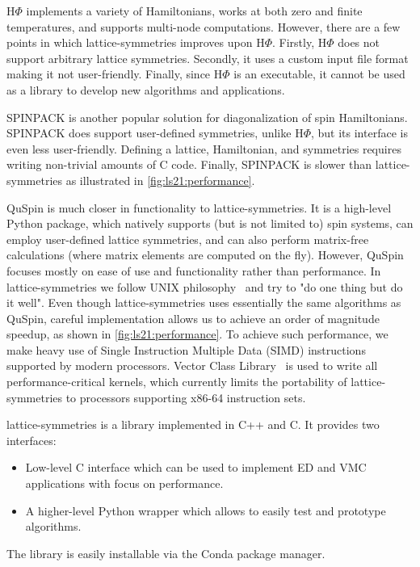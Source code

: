 $\text{H}\Phi$ implements a variety of Hamiltonians, works at both zero and finite temperatures, and supports multi-node computations. However, there are a few points in which lattice-symmetries improves upon $\text{H}\Phi$. Firstly, $\text{H}\Phi$ does not support arbitrary lattice symmetries. Secondly, it uses a custom input file format making it not user-friendly. Finally, since $\text{H}\Phi$ is an executable, it cannot be used as a library to develop new algorithms and applications.

SPINPACK is another popular solution for diagonalization of spin Hamiltonians. SPINPACK does support user-defined symmetries, unlike $\text{H}\Phi$, but its interface is even less user-friendly. Defining a lattice, Hamiltonian, and symmetries requires writing non-trivial amounts of C code. Finally, SPINPACK is slower than lattice-symmetries as illustrated in \autoref{fig:ls21:performance}.

QuSpin is much closer in functionality to lattice-symmetries. It is a high-level Python package, which natively supports (but is not limited to) spin systems, can employ user-defined lattice symmetries, and can also perform matrix-free calculations (where matrix elements are computed on the fly). However, QuSpin focuses mostly on ease of use and functionality rather than performance. In lattice-symmetries we follow UNIX philosophy~\cite{salus1994} and try to "do one thing but do it well". Even though lattice-symmetries uses essentially the same algorithms as QuSpin, careful implementation allows us to achieve an order of magnitude speedup, as shown in \autoref{fig:ls21:performance}. To achieve such performance, we make heavy use of Single Instruction Multiple Data (SIMD) instructions supported by modern processors. Vector Class Library~\cite{vectorclass} is used to write all performance-critical kernels, which currently limits the portability of lattice-symmetries to processors supporting x86-64 instruction sets.

lattice-symmetries is a library implemented in C++ and C. It provides two interfaces:
\begin{itemize}[topsep=0pt,noitemsep]
  \item Low-level C interface which can be used to implement ED and VMC applications with focus on performance.
  \item A higher-level Python wrapper which allows to easily test and prototype algorithms.
\end{itemize}

The library is easily installable via the Conda package manager.

